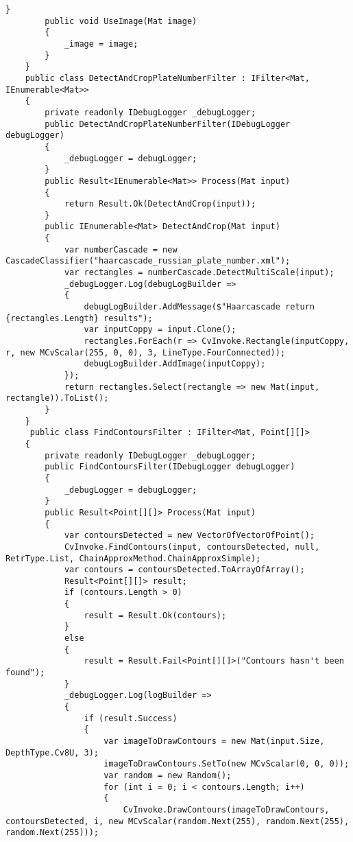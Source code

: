 \begin{lstlisting}[style=fsharpstyle,caption={Исходный код}, label=lst:recognition_result_handler]
        }
        public void UseImage(Mat image)
        {
            _image = image;
        }
    }
    public class DetectAndCropPlateNumberFilter : IFilter<Mat, IEnumerable<Mat>>
    {
        private readonly IDebugLogger _debugLogger;
        public DetectAndCropPlateNumberFilter(IDebugLogger debugLogger)
        {
            _debugLogger = debugLogger;
        }
        public Result<IEnumerable<Mat>> Process(Mat input)
        {
            return Result.Ok(DetectAndCrop(input));
        }
        public IEnumerable<Mat> DetectAndCrop(Mat input)
        {
            var numberCascade = new CascadeClassifier("haarcascade_russian_plate_number.xml");
            var rectangles = numberCascade.DetectMultiScale(input);
            _debugLogger.Log(debugLogBuilder =>
            {
                debugLogBuilder.AddMessage($"Haarcascade return {rectangles.Length} results");
                var inputCoppy = input.Clone();
                rectangles.ForEach(r => CvInvoke.Rectangle(inputCoppy, r, new MCvScalar(255, 0, 0), 3, LineType.FourConnected));
                debugLogBuilder.AddImage(inputCoppy);
            });
            return rectangles.Select(rectangle => new Mat(input, rectangle)).ToList();
        }
    }
     public class FindContoursFilter : IFilter<Mat, Point[][]>
    {
        private readonly IDebugLogger _debugLogger;
        public FindContoursFilter(IDebugLogger debugLogger)
        {
            _debugLogger = debugLogger;
        }
        public Result<Point[][]> Process(Mat input)
        {
            var contoursDetected = new VectorOfVectorOfPoint();
            CvInvoke.FindContours(input, contoursDetected, null, RetrType.List, ChainApproxMethod.ChainApproxSimple);
            var contours = contoursDetected.ToArrayOfArray();
            Result<Point[][]> result;
            if (contours.Length > 0)
            {
                result = Result.Ok(contours);
            }
            else
            {
                result = Result.Fail<Point[][]>("Contours hasn't been found");
            }
            _debugLogger.Log(logBuilder =>
            {
                if (result.Success)
                {
                    var imageToDrawContours = new Mat(input.Size, DepthType.Cv8U, 3);
                    imageToDrawContours.SetTo(new MCvScalar(0, 0, 0));
                    var random = new Random();
                    for (int i = 0; i < contours.Length; i++)
                    {
                        CvInvoke.DrawContours(imageToDrawContours, contoursDetected, i, new MCvScalar(random.Next(255), random.Next(255), random.Next(255)));

\end{lstlisting}
